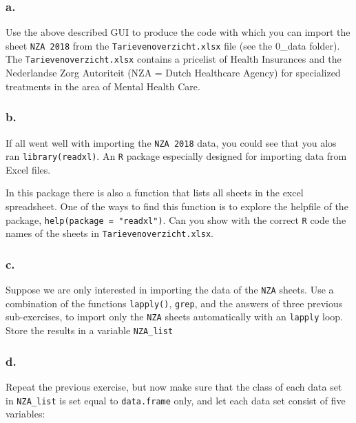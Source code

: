 \documentclass[]{article}
\begin{document}
\hypertarget{a.-5}{%
\subsubsection{a.}\label{a.-5}}

Use the above described GUI to produce the code with which you can
import the sheet \texttt{NZA\ 2018} from the
\texttt{Tarievenoverzicht.xlsx} file (see the 0\_data folder). The
\texttt{Tarievenoverzicht.xlsx} contains a pricelist of Health
Insurances and the Nederlandse Zorg Autoriteit (NZA = Dutch Healthcare
Agency) for specialized treatments in the area of Mental Health Care.

\hypertarget{b.-6}{%
\subsubsection{b.}\label{b.-6}}

If all went well with importing the \texttt{NZA\ 2018} data, you could
see that you alos ran \texttt{library(readxl)}. An \texttt{R} package
especially designed for importing data from Excel files.

In this package there is also a function that lists all sheets in the
excel spreadsheet. One of the ways to find this function is to explore
the helpfile of the package, \texttt{help(package\ =\ "readxl")}. Can
you show with the correct \texttt{R} code the names of the sheets in
\texttt{Tarievenoverzicht.xlsx}.

\hypertarget{c.-6}{%
\subsubsection{c.}\label{c.-6}}

Suppose we are only interested in importing the data of the \texttt{NZA}
sheets. Use a combination of the functions \texttt{lapply()},
\texttt{grep}, and the answers of three previous sub-exercises, to
import only the \texttt{NZA} sheets automatically with an
\texttt{lapply} loop. Store the results in a variable \texttt{NZA\_list}

\hypertarget{d.-1}{%
\subsubsection{d.}\label{d.-1}}

Repeat the previous exercise, but now make sure that the class of each
data set in \texttt{NZA\_list} is set equal to \texttt{data.frame} only,
and let each data set consist of five variables:
\end{document}
